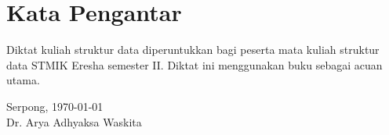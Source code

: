 \chapter*{Kata Pengantar}
Diktat kuliah struktur data diperuntukkan bagi peserta mata kuliah struktur data STMIK Eresha semester II. Diktat ini menggunakan buku \cite{adam2001data,group2005data} sebagai acuan utama. 

\vspace*{0.1cm}
\begin{flushright}
Serpong, \today\\[0.1cm]
\vspace*{1cm}
Dr. Arya Adhyaksa Waskita

\end{flushright}
